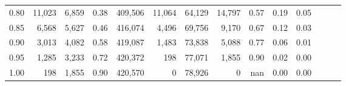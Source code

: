 \begin{tabular}{rrrrrrrrrrrrrr}
0.80 &  11,023 &  6,859 &  0.38 &  409,506 &   11,064 &  64,129 &  14,797 &  0.57 &  0.19 &      0.05 \\
0.85 &   6,568 &  5,627 &  0.46 &  416,074 &    4,496 &  69,756 &   9,170 &  0.67 &  0.12 &      0.03 \\
0.90 &   3,013 &  4,082 &  0.58 &  419,087 &    1,483 &  73,838 &   5,088 &  0.77 &  0.06 &      0.01 \\
0.95 &   1,285 &  3,233 &  0.72 &  420,372 &      198 &  77,071 &   1,855 &  0.90 &  0.02 &      0.00 \\
1.00 &     198 &  1,855 &  0.90 &  420,570 &        0 &  78,926 &       0 &   nan &  0.00 &      0.00 \\
\bottomrule
\end{tabular}
